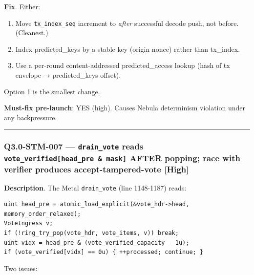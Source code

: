 \documentclass[
]{article}
\providecommand{\tightlist}{%
  \setlength{\itemsep}{0pt}\setlength{\parskip}{0pt}}
\begin{document}
\textbf{Fix}. Either:

\begin{enumerate}
\def\labelenumi{\arabic{enumi}.}
\tightlist
\item
  Move \texttt{tx\_index\_seq} increment to \emph{after} successful
  decode push, not before. (Cleanest.)
\item
  Index predicted\_keys by a stable key (origin \textbar\textbar{}
  nonce) rather than tx\_index.
\item
  Use a per-round content-addressed predicted\_access lookup (hash of tx
  envelope → predicted\_keys offset).
\end{enumerate}

Option 1 is the smallest change.

\textbf{Must-fix pre-launch}: YES (high). Causes Nebula determinism
violation under any backpressure.

\begin{center}\rule{0.5\linewidth}{0.5pt}\end{center}

\subsubsection{\texorpdfstring{Q3.0-STM-007 --- \texttt{drain\_vote}
reads \texttt{vote\_verified{[}head\_pre\ \&\ mask{]}} AFTER popping;
race with verifier produces accept-tampered-vote
{[}High{]}}{Q3.0-STM-007 --- drain\_vote reads vote\_verified{[}head\_pre \& mask{]} AFTER popping; race with verifier produces accept-tampered-vote {[}High{]}}}\label{q30-stm-007--drain_vote-reads-vote_verifiedhead_pre--mask-after-popping-race-with-verifier-produces-accept-tampered-vote-high}

\textbf{Description}. The Metal \texttt{drain\_vote} (line 1148-1187)
reads:

\begin{verbatim}
uint head_pre = atomic_load_explicit(&vote_hdr->head, memory_order_relaxed);
VoteIngress v;
if (!ring_try_pop(vote_hdr, vote_items, v)) break;
uint vidx = head_pre & (vote_verified_capacity - 1u);
if (vote_verified[vidx] == 0u) { ++processed; continue; }
\end{verbatim}

Two issues:
\end{document}
